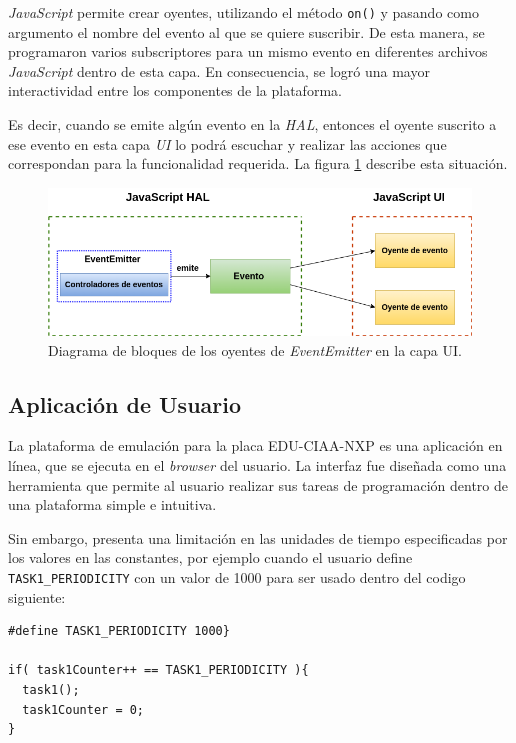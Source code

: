 \textit{JavaScript} permite crear oyentes, utilizando el método \texttt{on()} y pasando como argumento el nombre del evento al que se quiere suscribir. De esta manera, se  programaron varios subscriptores para un mismo evento en diferentes archivos \textit{JavaScript} dentro de esta capa. En consecuencia, se logró una mayor interactividad entre los componentes de la plataforma.

Es decir, cuando se emite algún evento en la \textit{HAL}, entonces el oyente suscrito a ese evento en esta capa \textit{UI} lo podrá escuchar y realizar las acciones que correspondan para la funcionalidad requerida. La figura \ref{fig:EventemitterNodeJSUI} describe esta situación.

\begin{figure}[ht]
	\centering
	\includegraphics[scale=.52]{./Figures/EventemitterNodeJSUI.png}
	\caption{Diagrama de bloques de los oyentes de \textit{EventEmitter} en la capa UI.}
	\label{fig:EventemitterNodeJSUI}
\end{figure}




\subsection{Aplicación de Usuario}
La plataforma de emulación para la placa EDU-CIAA-NXP es una aplicación en línea, que se ejecuta en el \textit{browser} del usuario. La interfaz fue diseñada como una herramienta que permite al usuario realizar sus tareas de programación dentro de una plataforma simple e intuitiva.

Sin embargo, presenta una limitación en las unidades de tiempo especificadas por los valores en las constantes, por ejemplo cuando el usuario define \texttt{TASK1\_PERIODICITY} con un valor de 1000 para ser usado dentro del codigo siguiente: 
	
\begin{lstlisting}[caption={Ejemplo TASK1\_PERIODICITY}]
#define TASK1_PERIODICITY 1000} 

if( task1Counter++ == TASK1_PERIODICITY ){
  task1();
  task1Counter = 0;
}
\end{lstlisting}	
	


